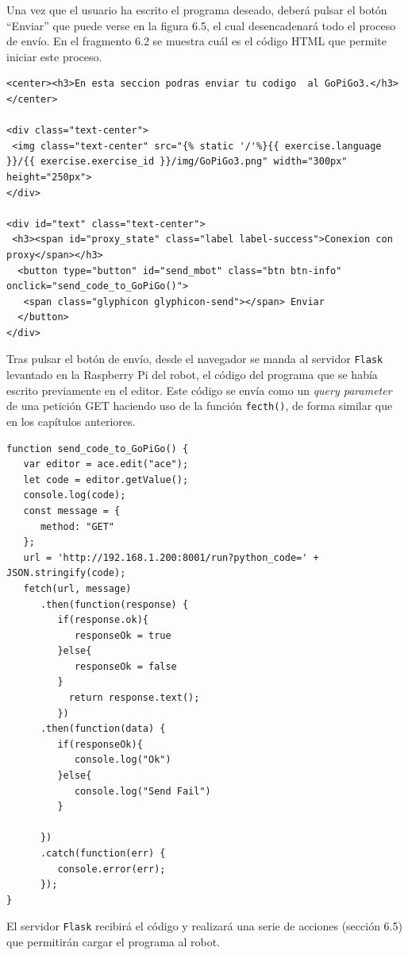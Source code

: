 Una vez que el usuario ha escrito el programa deseado, deberá pulsar el botón “Enviar” que puede verse en la figura 6.5, el cual desencadenará todo el proceso de envío. En el fragmento 6.2 se muestra cuál es el código HTML que permite iniciar este proceso.
\\
\begin{lstlisting}[frame=single,breaklines=true, label=Sección para el envío, caption=Sección para el envío,  captionpos=b]
<center><h3>En esta seccion podras enviar tu codigo  al GoPiGo3.</h3></center>

<div class="text-center">
 <img class="text-center" src="{% static '/'%}{{ exercise.language }}/{{ exercise.exercise_id }}/img/GoPiGo3.png" width="300px" height="250px">
</div>

<div id="text" class="text-center">
 <h3><span id="proxy_state" class="label label-success">Conexion con proxy</span></h3>
  <button type="button" id="send_mbot" class="btn btn-info" onclick="send_code_to_GoPiGo()">
   <span class="glyphicon glyphicon-send"></span> Enviar
  </button>
</div>
\end{lstlisting}
Tras pulsar el botón de envío, desde el navegador se manda al servidor \texttt{Flask} levantado en la Raspberry Pi del robot, el código del programa que se había escrito previamente en el editor. Este código se envía como un \textit{query parameter} de una petición GET haciendo uso de la función \texttt{fecth()}, de forma similar que en los capítulos anteriores.
\\
\begin{lstlisting}[frame=single,breaklines=true, label=Función de envío del código al servidor del GopiGo3, caption=Función de envío del código al servidor del GopiGo3,  captionpos=b]
function send_code_to_GoPiGo() {
   var editor = ace.edit("ace");
   let code = editor.getValue();
   console.log(code);
   const message = {
      method: "GET"
   };
   url = 'http://192.168.1.200:8001/run?python_code=' + JSON.stringify(code);
   fetch(url, message)
      .then(function(response) {
         if(response.ok){
            responseOk = true
         }else{
            responseOk = false
         }
           return response.text();
         })
      .then(function(data) {
         if(responseOk){
            console.log("Ok")
         }else{
            console.log("Send Fail")
         }

      })
      .catch(function(err) {
         console.error(err);
      });
}
\end{lstlisting}
El servidor \texttt{Flask} recibirá el código y realizará una serie de acciones (sección 6.5) que permitirán cargar el programa al robot.

